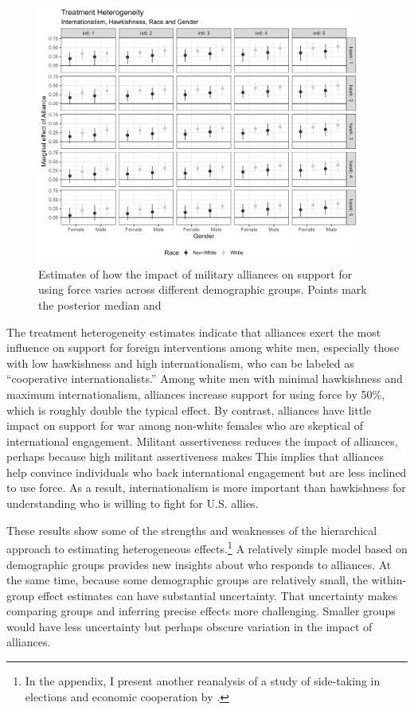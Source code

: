 \documentclass[12pt]{article}
\begin{document}
\begin{figure}[htpb]
	\centering
		\includegraphics[width=0.95\textwidth]{../figures/tw-treat-het.png}
	\caption{Estimates of how the impact of military alliances on support for using force varies across different demographic groups. Points mark the posterior median and }
	\label{fig:tw-treat-het}
\end{figure}


The treatment heterogeneity estimates indicate that alliances exert the most influence on support for foreign interventions among white men, especially those with low hawkishness and high internationalism, who can be labeled as ``cooperative internationalists.'' 
Among white men with minimal hawkishness and maximum internationalism, alliances increase support for using force by 50\%, which is roughly double the typical effect. 
By contrast, alliances have little impact on support for war among non-white females who are skeptical of international engagement.
Militant assertiveness reduces the impact of alliances, perhaps because high militant assertiveness makes  
This implies that alliances help convince individuals who back international engagement but are less inclined to use force. 
As a result, internationalism is more important than hawkishness for understanding who is willing to fight for U.S. allies. 


These results show some of the strengths and weaknesses of the hierarchical approach to estimating heterogeneous effects.\footnote{In the appendix, I present another reanalysis of a study of side-taking in elections and economic cooperation by \citet{BushPrather2020}.}
A relatively simple model based on demographic groups provides new insights about who responds to alliances. 
At the same time, because some demographic groups are relatively small, the within-group effect estimates can have substantial uncertainty. 
That uncertainty makes comparing groups and inferring precise effects more challenging. 
Smaller groups would have less uncertainty but perhaps obscure variation in the impact of alliances. 
\end{document}
